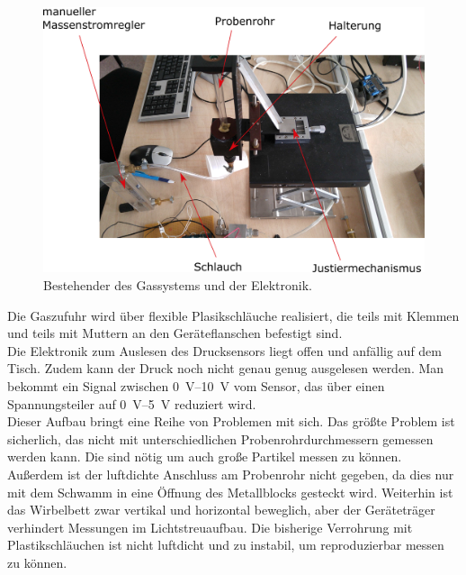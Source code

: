 \begin{figure}[h!]
	\begin{center}
		\includegraphics[scale=0.3]{Altes_Wirbelbett_oben.png}
		\caption[Alter Aufbau 1]{Bestehender des Gassystems und der Elektronik.}
	\end{center}
\end{figure}	


Die Gaszufuhr wird über flexible Plasikschläuche realisiert, die teils mit Klemmen und teils mit Muttern an den Geräteflanschen befestigt sind. \\
Die Elektronik zum Auslesen des Drucksensors liegt offen und anfällig auf dem Tisch. Zudem kann der Druck noch nicht genau genug ausgelesen werden. Man bekommt ein Signal zwischen \SIrange{0}{10}{\volt} vom Sensor, das über einen Spannungsteiler auf \SIrange{0}{5}{\volt} reduziert wird. \\
Dieser Aufbau bringt eine Reihe von Problemen mit sich. Das größte Problem ist sicherlich, das nicht mit unterschiedlichen Probenrohrdurchmessern gemessen werden kann. Die sind nötig um auch große Partikel messen zu können. Außerdem ist der luftdichte Anschluss am Probenrohr nicht gegeben, da dies nur mit dem Schwamm in eine Öffnung des Metallblocks gesteckt wird.
Weiterhin ist das Wirbelbett zwar vertikal und horizontal beweglich, aber der Geräteträger verhindert Messungen im Lichtstreuaufbau.
Die bisherige Verrohrung mit Plastikschläuchen ist nicht luftdicht und zu instabil, um reproduzierbar messen zu können. \\



